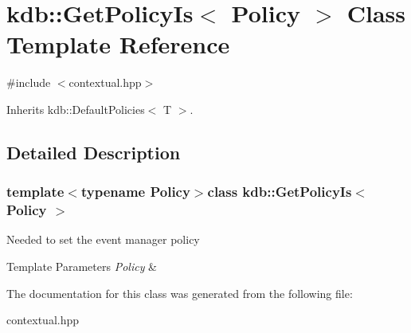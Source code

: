 \hypertarget{classkdb_1_1GetPolicyIs}{\section{kdb\-:\-:Get\-Policy\-Is$<$ Policy $>$ Class Template Reference}
\label{classkdb_1_1GetPolicyIs}
}


{\ttfamily \#include $<$contextual.\-hpp$>$}



Inherits kdb\-::\-Default\-Policies$<$ T $>$.



\subsection{Detailed Description}
\subsubsection*{template$<$typename Policy$>$class kdb\-::\-Get\-Policy\-Is$<$ Policy $>$}

Needed to set the event manager policy


\begin{DoxyTemplParams}{Template Parameters}
{\em Policy} & \\
\hline
\end{DoxyTemplParams}


The documentation for this class was generated from the following file\-:\begin{DoxyCompactItemize}
\item 
contextual.\-hpp\end{DoxyCompactItemize}
